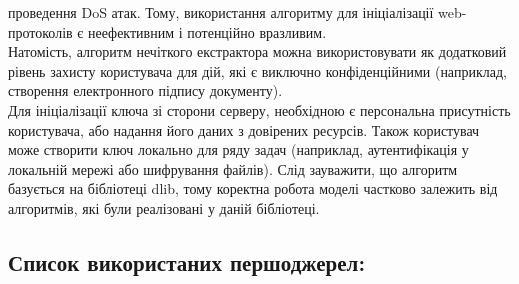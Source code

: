 \documentclass[11pt]{article}
\begin{document}
проведення DoS атак. Тому, використання алгоритму для ініціалізації
web-протоколів є неефективним і потенційно вразливим.\\
Натомість, алгоритм нечіткого екстрактора можна використовувати як
додатковий рівень захисту користувача для дій, які є виключно
конфіденційними (наприклад, створення електронного підпису документу).\\
Для ініціалізації ключа зі сторони серверу, необхідною є персональна
присутність користувача, або надання його даних з довірених ресурсів.
Також користувач може створити ключ локально для ряду задач (наприклад,
аутентифікація у локальній мережі або шифрування файлів). Слід
зауважити, що алгоритм базується на бібліотеці dlib, тому коректна
робота моделі частково залежить від алгоритмів, які були реалізовані у
даній бібліотеці.

    \hypertarget{ux441ux43fux438ux441ux43eux43a-ux432ux438ux43aux43eux440ux438ux441ux442ux430ux43dux438ux445-ux43fux435ux440ux448ux43eux434ux436ux435ux440ux435ux43b}{%
\subsection{Список використаних
першоджерел:}\label{ux441ux43fux438ux441ux43eux43a-ux432ux438ux43aux43eux440ux438ux441ux442ux430ux43dux438ux445-ux43fux435ux440ux448ux43eux434ux436ux435ux440ux435ux43b}}
\end{document}

